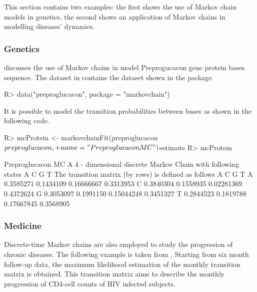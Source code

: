 \documentclass[nojss]{jss}
\begin{document}
This section contains two examples: the first shows the use of Markov chain
models in genetics, the second shows an application
of Markov chains in modelling diseases' dynamics.


\subsubsection{Genetics}\label{sec:genetics}

\cite{averyHenderson} discusses the use of Markov chains in model Preprogucacon
gene protein bases sequence. The  dataset in 
contains the dataset shown in the package.

\begin{Schunk}
\begin{Sinput}
R> data("preproglucacon", package = "markovchain")
\end{Sinput}
\end{Schunk}

It is possible to model the transition probabilities between bases as shown in the following code.

\begin{Schunk}
\begin{Sinput}
R> mcProtein <- markovchainFit(preproglucacon$preproglucacon, 
+                            name = "Preproglucacon MC")$estimate
R> mcProtein
\end{Sinput}
\begin{Soutput}
Preproglucacon MC 
 A  4 - dimensional discrete Markov Chain with following states 
 A C G T 
 The transition matrix   (by rows)  is defined as follows 
          A         C          G         T
A 0.3585271 0.1434109 0.16666667 0.3313953
C 0.3840304 0.1558935 0.02281369 0.4372624
G 0.3053097 0.1991150 0.15044248 0.3451327
T 0.2844523 0.1819788 0.17667845 0.3568905
\end{Soutput}
\end{Schunk}

\subsubsection{Medicine}\label{sec:medicine}

Discrete-time Markov chains are also employed to study the progression of chronic diseases.
The following example is taken from \cite{craigSendi}. Starting from six month follow-up data, the maximum likelihood estimation
of the monthly transition matrix is obtained. This transition matrix aims to describe the monthly progression of CD4-cell counts of HIV infected subjects.
\end{document}
